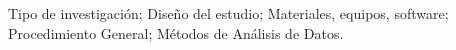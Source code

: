 Tipo de investigación; Diseño del estudio; Materiales, equipos, software; Procedimiento General; Métodos de Análisis de Datos.